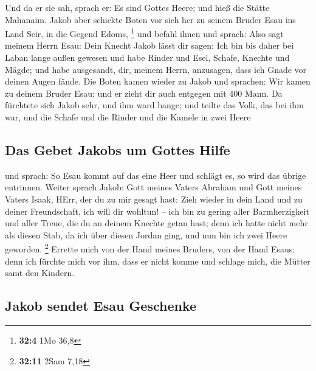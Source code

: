 Und da er sie sah, sprach er: Es sind Gottes Heere; und
hieß die Stätte Mahanaim.  Jakob aber schickte Boten vor
sich her zu seinem Bruder Esau ins Land Seir, in die Gegend Edoms,
\footnote{\textbf{32:4} 1Mo 36,8}  und befahl ihnen und
sprach: Also sagt meinem Herrn Esau: Dein Knecht Jakob lässt dir sagen:
Ich bin bis daher bei Laban lange außen gewesen  und habe
Rinder und Esel, Schafe, Knechte und Mägde; und habe ausgesandt, dir,
meinem Herrn, anzusagen, dass ich Gnade vor deinen Augen fände.
 Die Boten kamen wieder zu Jakob und sprachen: Wir kamen
zu deinem Bruder Esau; und er zieht dir auch entgegen mit 400 Mann.
 Da fürchtete sich Jakob sehr, und ihm ward bange; und
teilte das Volk, das bei ihm war, und die Schafe und die Rinder und die
Kamele in zwei Heere

\hypertarget{das-gebet-jakobs-um-gottes-hilfe}{%
\subsection{Das Gebet Jakobs um Gottes
Hilfe}\label{das-gebet-jakobs-um-gottes-hilfe}}

 und sprach: So Esau kommt auf das eine Heer und schlägt
es, so wird das übrige entrinnen.  Weiter sprach Jakob:
Gott meines Vaters Abraham und Gott meines Vaters Isaak, HErr, der du zu
mir gesagt hast: Zieh wieder in dein Land und zu deiner Freundschaft,
ich will dir wohltun! --  ich bin zu gering aller
Barmherzigkeit und aller Treue, die du an deinem Knechte getan hast;
denn ich hatte nicht mehr als diesen Stab, da ich über diesen Jordan
ging, und nun bin ich zwei Heere geworden. \footnote{\textbf{32:11} 2Sam
  7,18}  Errette mich von der Hand meines Bruders, von
der Hand Esaus; denn ich fürchte mich vor ihm, dass er nicht komme und
schlage mich, die Mütter samt den Kindern.

\hypertarget{jakob-sendet-esau-geschenke}{%
\subsection{Jakob sendet Esau
Geschenke}\label{jakob-sendet-esau-geschenke}}

